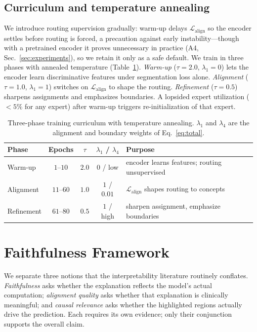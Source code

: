 \documentclass[runningheads]{llncs}
\begin{document}
\subsection{Curriculum and temperature annealing}\label{sec:curriculum}
We introduce routing supervision gradually: warm-up delays $\mathcal{L}_{\text{align}}$ so the
encoder settles before routing is forced, a precaution against early instability---though with a
pretrained encoder it proves unnecessary in practice (A4, Sec.~\ref{sec:experiments}), so we
retain it only as a safe default. We train in
three phases with annealed temperature (Table~\ref{tab:curriculum}). \emph{Warm-up}
($\tau{=}2.0$, $\lambda_1{=}0$) lets the encoder learn discriminative features under
segmentation loss alone. \emph{Alignment} ($\tau{=}1.0$, $\lambda_1{=}1$) switches on
$\mathcal{L}_{\text{align}}$ to shape the routing. \emph{Refinement} ($\tau{=}0.5$)
sharpens assignments and emphasizes boundaries. A lopsided expert utilization
($<\!5\%$ for any expert) after warm-up triggers re-initialization of that expert.

\begin{table}[t]
\centering
\caption{Three-phase training curriculum with temperature annealing. $\lambda_1$ and
$\lambda_4$ are the alignment and boundary weights of Eq.~\ref{eq:total}.}
\label{tab:curriculum}
\begin{tabular}{lcccl}
\toprule
Phase & Epochs & $\tau$ & $\lambda_1$ / $\lambda_4$ & Purpose \\
\midrule
Warm-up    & $1$--$10$  & $2.0$ & $0$ / low   & encoder learns features; routing unsupervised \\
Alignment  & $11$--$60$ & $1.0$ & $1$ / $0.01$ & $\mathcal{L}_{\text{align}}$ shapes routing to concepts \\
Refinement & $61$--$80$ & $0.5$ & $1$ / high   & sharpen assignment, emphasize boundaries \\
\bottomrule
\end{tabular}
\end{table}

\section{Faithfulness Framework}\label{sec:theory}
We separate three notions that the interpretability literature routinely conflates.
\emph{Faithfulness} asks whether the explanation reflects the model's actual computation;
\emph{alignment quality} asks whether that explanation is clinically meaningful; and
\emph{causal relevance} asks whether the highlighted regions actually drive the prediction.
Each requires its own evidence; only their conjunction supports the overall claim.
\end{document}
